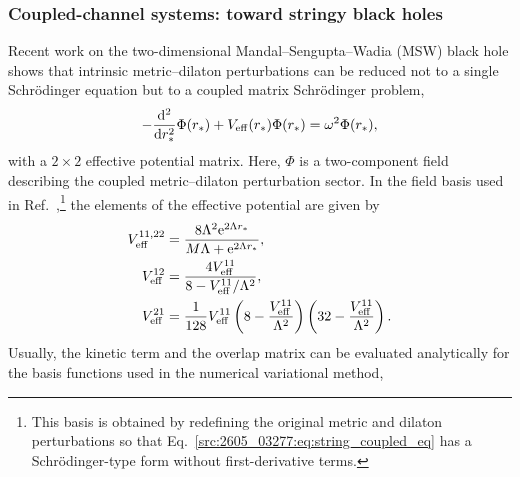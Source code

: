 \subsubsection{Coupled-channel systems: toward stringy black holes}
Recent work on the two-dimensional Mandal--Sengupta--Wadia (MSW) black hole shows that intrinsic
metric--dilaton perturbations can be reduced not to a single Schr\"odinger
equation but to a coupled matrix Schr\"odinger problem,
\begin{align}
    -\frac{\mathrm{d}^2}{\mathrm{d} r_*^2}\Phi(r_*)
    +
    V_{\mathrm{eff}}(r_*)\Phi(r_*)
    =
    \omega^2 \Phi(r_*),
    \label{src:2605_03277:eq:string_coupled_eq}
\end{align}
with a $2\times2$ effective potential matrix.
Here, $\Phi$ is a two-component field describing the coupled
metric--dilaton perturbation sector.
In the field basis used in Ref.~\cite{Bian:2026crb},\footnote{%
This basis is obtained by redefining the original metric and dilaton
perturbations so that Eq.~\eqref{src:2605_03277:eq:string_coupled_eq} has a
Schr\"odinger-type form without first-derivative terms.}
the elements of the effective potential are given by
\begin{align}
    V_{\mathrm{eff}}^{11,22}
    &= \frac{8\Lambda^2 \mathrm{e}^{2\Lambda r_*}}{M\Lambda + \mathrm{e}^{2\Lambda r_*}} ,
    \\
    V_{\mathrm{eff}}^{12}
    &= \frac{4V_{\mathrm{eff}}^{11}}{8-V_{\mathrm{eff}}^{11}/\Lambda^2} ,
    \\
    V_{\mathrm{eff}}^{21}
    &= \frac{1}{128} V_{\mathrm{eff}}^{11}
    \left(8-\frac{V_{\mathrm{eff}}^{11}}{\Lambda^2}\right)
    \left(32-\frac{V_{\mathrm{eff}}^{11}}{\Lambda^2}\right).
    \label{src:2605_03277:eq:string_pot}
\end{align}
Usually, the kinetic term and the overlap matrix can be evaluated
analytically for the basis functions used in the numerical variational method,
